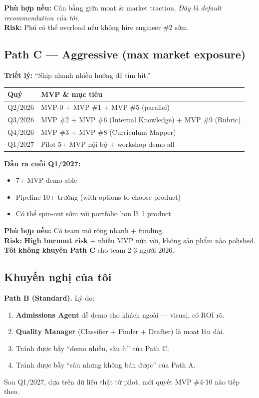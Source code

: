 \documentclass[11pt,a4paper]{article}
\begin{document}
\textbf{Phù hợp nếu:} Cân bằng giữa moat \& market traction. \emph{Đây là default
recommendation của tôi.}\\
\textbf{Risk:} Phú có thể overload nếu không hire engineer \#2 sớm.

\subsection{Path C --- Aggressive (max market exposure)}

\textbf{Triết lý:} ``Ship nhanh nhiều hướng để tìm hit.''

\begin{tabularx}{\linewidth}{@{}p{2cm} X@{}}
\toprule
\textbf{Quý} & \textbf{MVP \& mục tiêu} \\
\midrule
Q2/2026 & MVP-0 + MVP \#1 + MVP \#5 (parallel) \\
Q3/2026 & MVP \#2 + MVP \#6 (Internal Knowledge) + MVP \#9 (Rubric) \\
Q4/2026 & MVP \#3 + MVP \#8 (Curriculum Mapper) \\
Q1/2027 & Pilot 5+ MVP nội bộ + workshop demo all \\
\bottomrule
\end{tabularx}

\textbf{Đầu ra cuối Q1/2027:}
\begin{itemize}
\item 7+ MVP demo-able
\item Pipeline 10+ trường (with options to choose product)
\item Có thể spin-out sớm với portfolio hơn là 1 product
\end{itemize}

\textbf{Phù hợp nếu:} Có team mở rộng nhanh + funding. \\
\textbf{Risk:} \textbf{High burnout risk} + nhiều MVP nửa vời, không sản phẩm nào polished.\\
\textbf{Tôi không khuyên Path C} cho team 2-3 người 2026.

\subsection{Khuyến nghị của tôi}

\begin{keybox}[title=Recommended path]
\textbf{Path B (Standard).} Lý do:

\begin{enumerate}
\item \textbf{Admissions Agent} dễ demo cho khách ngoài --- visual, có ROI rõ.
\item \textbf{Quality Manager} (Classifier + Finder + Drafter) là moat lâu dài.
\item Tránh được bẫy ``demo nhiều, sâu ít'' của Path C.
\item Tránh được bẫy ``sâu nhưng không bán được'' của Path A.
\end{enumerate}

Sau Q1/2027, dựa trên dữ liệu thật từ pilot, mới quyết MVP \#4-10 nào tiếp theo.
\end{keybox}
\end{document}
